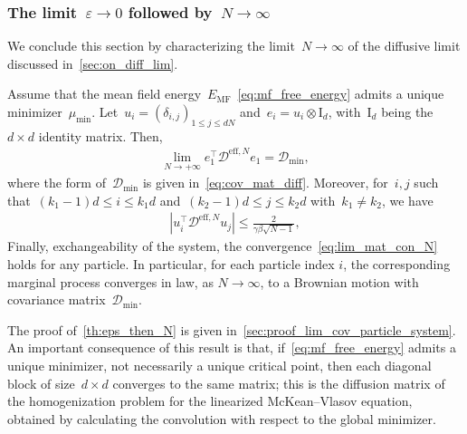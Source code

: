 \documentclass[onefignum,onetabnum]{siamart251216} %
\newcommand{\mc}[1]{\mathcal{#1}}
\renewcommand{\leq}{\leqslant}
\newcommand{\mescin}{\mu}
\newcommand{\emf}{E_{\mathrm{MF}}}
\newcommand{\DeffN}{\mc{D}^{\mathrm{eff},N}}
\newcommand{\eps}{\varepsilon}
\newcommand{\rg}[1]{\textcolor{rose}{\rm{[RG : #1]}}}
\theoremstyle{plain}
\numberwithin{equation}{section}
\numberwithin{theorem}{section}
\begin{document}
\subsubsection{The limit~\texorpdfstring{$\eps \rightarrow 0$}{eps to 0} followed by~\texorpdfstring{$N\rightarrow\infty$}{N to infinity}}
\label{sec:eps_0_then_N_inf}
We conclude this section by characterizing the limit~$N \rightarrow \infty$ of the diffusive limit discussed in~\cref{sec:on_diff_lim}.
\begin{theorem}
    \label{th:eps_then_N}
    Assume that the mean field energy~$\emf$~\eqref{eq:mf_free_energy} admits a unique minimizer~$\mescin_{\min}$.
    Let~$u_i = (\delta_{i,j})_{1\leq j\leq dN}$ and~$e_i = u_i \otimes \text{I}_d$, with~$\text{I}_d$ being the $d \times d$ identity matrix. Then,
    \begin{align}
        \label{eq:lim_mat_con_N}
        \lim_{N \to +\infty} e_1^\top\DeffN e_1 = \mc{D}_{\min},
    \end{align}
    where the form of~$\mc{D}_{\min}$ is given in~\eqref{eq:cov_mat_diff}. Moreover, for~$i,j$ such that~$(k_1-1)d \leq i \leq k_1d$ and~$(k_2-1)d \leq j \leq k_2d$ with~$k_1 \neq k_2$, we have
    \begin{align*}
        \!\left|u_{i}^\top\DeffN u_{j}\right|\!\leq \frac{2}{\gamma\beta\sqrt{N-1}},
    \end{align*}
     Finally, exchangeability of the system, the convergence~\eqref{eq:lim_mat_con_N} holds for any particle. In particular, for each particle index \(i\), the corresponding marginal process converges in law, as \(N \to \infty\), to a Brownian motion with covariance matrix~\(\mc{D}_{\min}\).
\end{theorem}
The proof of~\cref{th:eps_then_N} is given in~\cref{sec:proof_lim_cov_particle_system}. An important consequence of this result is that, if~\eqref{eq:mf_free_energy} admits a unique minimizer, not necessarily a unique critical point, then each diagonal block of size~$d \times d$ converges to the same matrix; this is the diffusion matrix of the homogenization problem for the linearized McKean--Vlasov equation, obtained by calculating the convolution with respect to the global minimizer.
%
%
\end{document}
